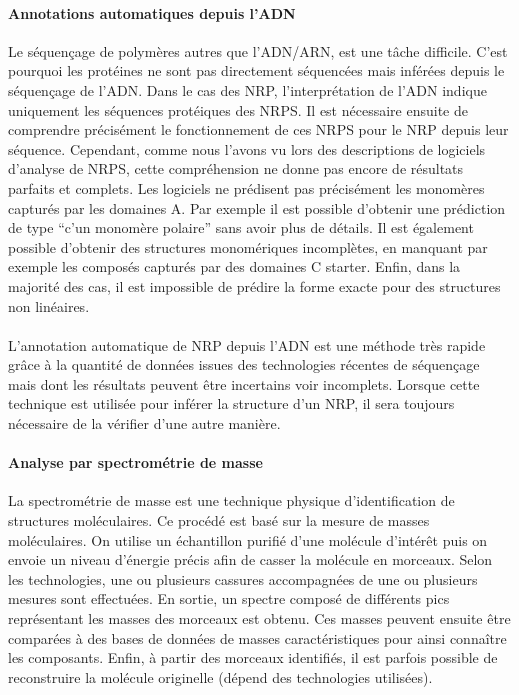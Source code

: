 \documentclass[12pt,french,twoside]{report}
\begin{document}
\paragraph{Annotations automatiques depuis l'ADN}
Le séquençage de polymères autres que l'ADN/ARN, est une tâche difficile.
C'est pourquoi les protéines ne sont pas directement séquencées mais inférées depuis le séquençage de l'ADN.
Dans le cas des NRP, l'interprétation de l'ADN indique uniquement les séquences protéiques des NRPS.
Il est nécessaire ensuite de comprendre précisément le fonctionnement de ces NRPS pour le NRP depuis leur séquence.
Cependant, comme nous l'avons vu lors des descriptions de logiciels d'analyse de NRPS, cette compréhension ne donne pas encore de résultats parfaits et complets.
Les logiciels ne prédisent pas précisément les monomères capturés par les domaines A.
Par exemple il est possible d'obtenir une prédiction de type ``c'un monomère polaire'' sans avoir plus de détails.
Il est également possible d'obtenir des structures monomériques incomplètes, en manquant par exemple les composés capturés par des domaines C starter.
Enfin, dans la majorité des cas, il est impossible de prédire la forme exacte pour des structures non linéaires.

\paragraph{}L'annotation automatique de NRP depuis l'ADN est une méthode très rapide grâce à la quantité de données issues des technologies récentes de séquençage mais dont les résultats peuvent être incertains voir incomplets.
Lorsque cette technique est utilisée pour inférer la structure d'un NRP, il sera toujours nécessaire de la vérifier d'une autre manière.


\paragraph{Analyse par spectrométrie de masse}
La spectrométrie de masse est une technique physique d'identification de structures moléculaires.
Ce procédé est basé sur la mesure de masses moléculaires.
On utilise un échantillon purifié d'une molécule d'intérêt puis on envoie un niveau d'énergie précis afin de casser la molécule en morceaux.
Selon les technologies, une ou plusieurs cassures accompagnées de une ou plusieurs mesures sont effectuées.
En sortie, un spectre composé de différents pics représentant les masses des morceaux est obtenu.
Ces masses peuvent ensuite être comparées à des bases de données de masses caractéristiques pour ainsi connaître les composants.
Enfin, à partir des morceaux identifiés, il est parfois possible de reconstruire la molécule originelle (dépend des technologies utilisées).
\end{document}
